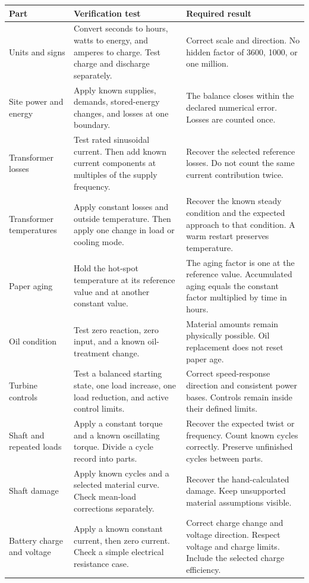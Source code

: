 \documentclass[11pt,a4paper]{report}
\begin{document}
\begin{longtable}{L{0.17\textwidth}L{0.36\textwidth}L{0.35\textwidth}}
\toprule Part & Verification test & Required result \\ \midrule\endhead
Units and signs & Convert seconds to hours, watts to energy, and amperes to charge. Test charge and discharge separately. & Correct scale and direction. No hidden factor of 3600, 1000, or one million. \\
Site power and energy & Apply known supplies, demands, stored-energy changes, and losses at one boundary. & The balance closes within the declared numerical error. Losses are counted once. \\
Transformer losses & Test rated sinusoidal current. Then add known current components at multiples of the supply frequency. & Recover the selected reference losses. Do not count the same current contribution twice. \\
Transformer temperatures & Apply constant losses and outside temperature. Then apply one change in load or cooling mode. & Recover the known steady condition and the expected approach to that condition. A warm restart preserves temperature. \\
Paper aging & Hold the hot-spot temperature at its reference value and at another constant value. & The aging factor is one at the reference value. Accumulated aging equals the constant factor multiplied by time in hours. \\
Oil condition & Test zero reaction, zero input, and a known oil-treatment change. & Material amounts remain physically possible. Oil replacement does not reset paper age. \\
Turbine controls & Test a balanced starting state, one load increase, one load reduction, and active control limits. & Correct speed-response direction and consistent power bases. Controls remain inside their defined limits. \\
Shaft and repeated loads & Apply a constant torque and a known oscillating torque. Divide a cycle record into parts. & Recover the expected twist or frequency. Count known cycles correctly. Preserve unfinished cycles between parts. \\
Shaft damage & Apply known cycles and a selected material curve. Check mean-load corrections separately. & Recover the hand-calculated damage. Keep unsupported material assumptions visible. \\
Battery charge and voltage & Apply a known constant current, then zero current. Check a simple electrical resistance case. & Correct charge change and voltage direction. Respect voltage and charge limits. Include the selected charge efficiency. \\

\end{longtable}
\end{document}
